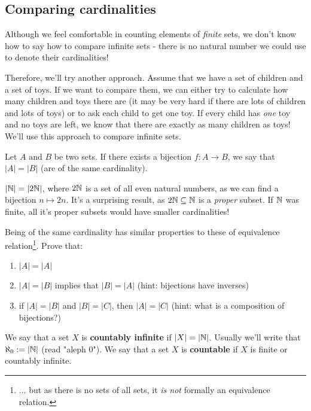 \subsection{Comparing cardinalities}
Although we feel comfortable in counting elements of \textit{finite} sets, we don't know how to say how to compare infinite sets - there is no natural number we could use to denote
their cardinalities!

Therefore, we'll try another approach. Assume that we have a set of children and a set of toys. If we want to compare them, we can either try to calculate how many children and toys there are (it may be very hard if there are lots of children and lots of toys) or to ask each child to get one toy. If every child has \textit{one} toy and no toys are left, we know
that there are exactly as many children as toys! We'll use this approach to compare infinite sets.

\begin{definition}
  Let $A$ and $B$ be two sets. If there exists a bijection $f:A\to B$, we say that $|A|=|B|$ (are of the same cardinality).
\end{definition}

\begin{example}
  $|\mathbb N|=|2\mathbb N|$, where $2\mathbb N$ is a set of all even natural numbers, as we can find a bijection $n\mapsto 2n$. It's a surprising result, as $2\mathbb N\subseteq \mathbb N$ is a \textit{proper} subset. If $\mathbb N$ was finite, all it's proper subsets would have smaller cardinalities!
\end{example}

\begin{exercise}
  Being of the same cardinality has similar properties to these of equivalence relation\footnote{... but as there is no sets of all sets, it \emph{is not} formally an equivalence relation.}. Prove that:
  \begin{enumerate}
    \item $|A|=|A|$
    \item $|A|=|B|$ implies that $|B|=|A|$ (hint: bijections have inverses)
    \item if $|A|=|B|$ and $|B|=|C|$, then $|A|=|C|$ (hint: what is a composition of bijections?)
  \end{enumerate}
\end{exercise}

\begin{definition}
  We say that a set $X$ is \textbf{countably infinite} if $|X|=|\mathbb N|$. Usually we'll write that $\aleph_0:=|\mathbb N|$ (read "aleph 0").
  We say that a set $X$ is \textbf{countable} if $X$ is finite or countably infinite.
\end{definition}

